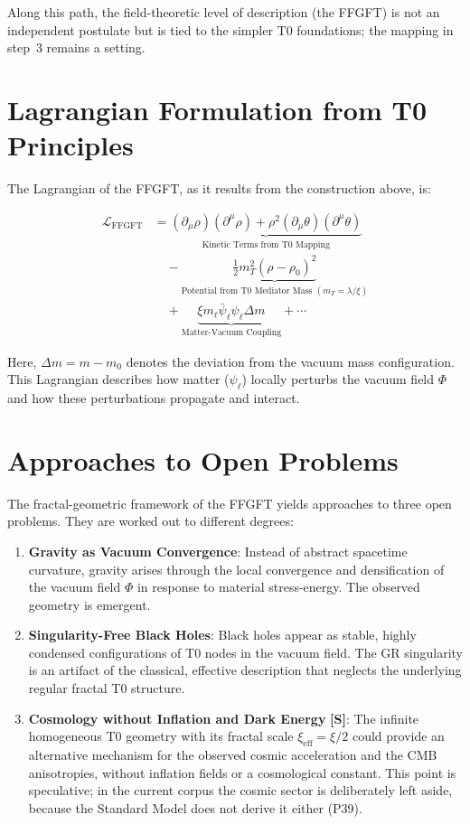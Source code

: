 	Along this path, the field-theoretic level of description (the FFGFT) is not an independent postulate but is tied to the simpler T0 foundations; the mapping in step~3 remains a setting.
	
	\section{Lagrangian Formulation from T0 Principles}
	
	The Lagrangian of the FFGFT, as it results from the construction above, is:
	
	\begin{align}
		\mathcal{L}_{\text{FFGFT}} &= \underbrace{(\partial_\mu \rho)(\partial^\mu \rho) + \rho^2 (\partial_\mu \theta)(\partial^\mu \theta)}_{\text{Kinetic Terms from T0 Mapping}} \\
		&\quad - \underbrace{\frac{1}{2} m_T^2 (\rho - \rho_0)^2}_{\text{Potential from T0 Mediator Mass } (m_T = \lambda / \xi)} \\
		&\quad + \underbrace{\xi m_\ell \bar{\psi}_\ell \psi_\ell \Delta m}_{\text{Matter-Vacuum Coupling}} + \cdots
	\end{align}
	
	Here, $\Delta m = m - m_0$ denotes the deviation from the vacuum mass configuration. This Lagrangian describes how matter ($\psi_\ell$) locally perturbs the vacuum field $\Phi$ and how these perturbations propagate and interact.
	
	\section{Approaches to Open Problems}
	
	The fractal-geometric framework of the FFGFT yields approaches to three open problems. They are worked out to different degrees:
	
	\begin{enumerate}
		\item \textbf{Gravity as Vacuum Convergence}: Instead of abstract spacetime curvature, gravity arises through the local convergence and densification of the vacuum field $\Phi$ in response to material stress-energy. The observed geometry is emergent.
		\item \textbf{Singularity-Free Black Holes}: Black holes appear as stable, highly condensed configurations of T0 nodes in the vacuum field. The GR singularity is an artifact of the classical, effective description that neglects the underlying regular fractal T0 structure.
		\item \textbf{Cosmology without Inflation and Dark Energy} \textbf{[S]}: The infinite homogeneous T0 geometry with its fractal scale $\xi_{\text{eff}} = \xi/2$ could provide an alternative mechanism for the observed cosmic acceleration and the CMB anisotropies, without inflation fields or a cosmological constant. This point is speculative; in the current corpus the cosmic sector is deliberately left aside, because the Standard Model does not derive it either (P39).
	\end{enumerate}
	
